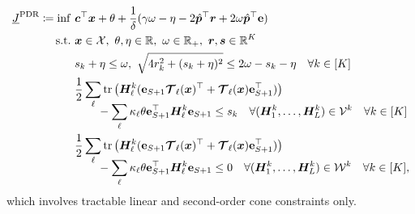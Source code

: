 \documentclass{article}
\newcommand{\st}{\textnormal{s.t.}}
\newcommand{\RR}{\mathbb{R}}
\newcommand{\X}{\mathcal{X}}
\newcommand{\tr}{\textup{tr}}
\begin{document}
\begin{subequations}
\label{eq:benders_mp}
\begin{align}
\underline{J}^{\textup{PDR}} \coloneqq \displaystyle \inf \ & \bm c^\top \bm x + \theta + \frac{1}{\delta} ( \gamma \omega - \eta - 2\hat{\bm p}^\top \bm r + 2\omega\hat{\bm p}^\top \mathbf{e}) \nonumber\\
 \st \ & \bm x \in \X, \  \theta, \eta \in \RR,\ \omega \in \RR_{+},\ \bm r, \bm s \in \RR^{K} \nonumber \\
 & s_k + \eta \leq \omega, \
 \sqrt{4r_k^2 + (s_k +  \eta)^2} \leq 2\omega - s_k -\eta \quad \forall k \in [K] \nonumber\\
 & \displaystyle \frac{1}{2}\sum_\ell  \tr \left (\bm H_\ell^k(\mathbf{e}_{S+1} \bm{\mathcal{T}}_\ell (\bm x)^\top + \bm{\mathcal{T}}_\ell (\bm x) \mathbf{e}_{S+1}^\top)\right ) \nonumber \\[-8pt]
 & \qquad -\sum_\ell \kappa_\ell \theta \mathbf{e}_{S+1}^\top \bm  H_\ell^k \mathbf{e}_{S+1} \leq s_k \quad \forall (\bm H_1^k, \dots, \bm H_L^k ) \in \mathcal{V}^k \quad \forall k \in [K] \label{eq:benders_mp_cons1}\\
 & \displaystyle \frac{1}{2}\sum_\ell  \tr\left (\bm H_\ell^k(\mathbf{e}_{S+1} \bm{\mathcal{T}}_\ell (\bm x)^\top + \bm{\mathcal{T}}_\ell (\bm x) \mathbf{e}_{S+1}^\top)\right )  \nonumber \\[-8pt]
 & \qquad-\sum_\ell \kappa_\ell \theta \mathbf{e}_{S+1}^\top \bm H_\ell^k \mathbf{e}_{S+1} \leq 0 \quad \forall (\bm H_1^k, \dots, \bm H_L^k ) \in \mathcal{W}^k \quad \forall k \in [K], \label{eq:benders_mp_cons2}
\end{align}
\end{subequations}
which  involves tractable linear and second-order cone constraints only. 
\end{document}
